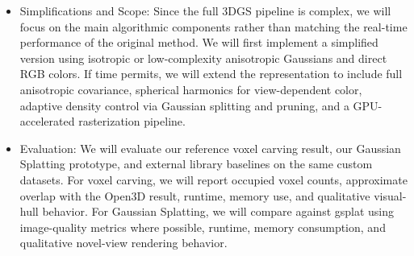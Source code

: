 \begin{itemize}
\item Simplifications and Scope: Since the full 3DGS pipeline is complex, we will focus on the main algorithmic components rather than matching the real-time performance of the original method. We will first implement a simplified version using isotropic or low-complexity anisotropic Gaussians and direct RGB colors. If time permits, we will extend the representation to include full anisotropic covariance, spherical harmonics for view-dependent color, adaptive density control via Gaussian splitting and pruning, and a GPU-accelerated rasterization pipeline.

\item Evaluation: We will evaluate our reference voxel carving result, our Gaussian Splatting prototype, and external library baselines on the same custom datasets. For voxel carving, we will report occupied voxel counts, approximate overlap with the Open3D result, runtime, memory use, and qualitative visual-hull behavior. For Gaussian Splatting, we will compare against gsplat using image-quality metrics where possible, runtime, memory consumption, and qualitative novel-view rendering behavior.

\end{itemize}



